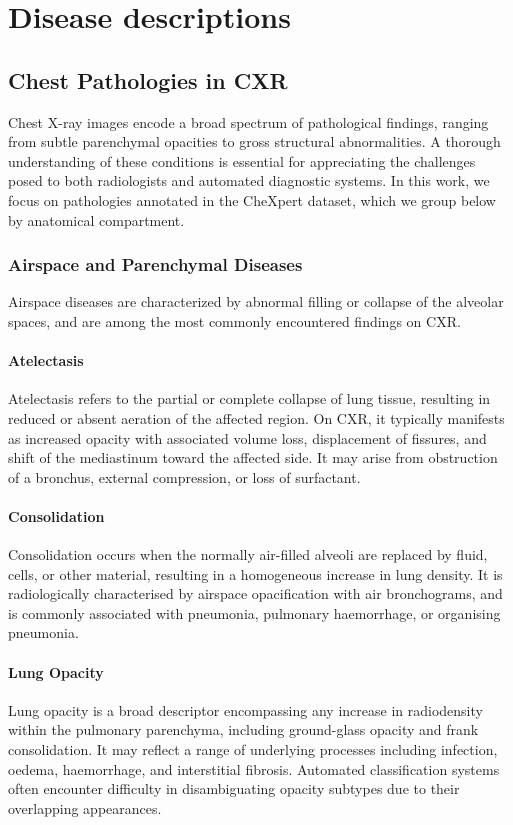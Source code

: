 \chapter{Disease descriptions}
\label{sec:pathologies}

\section{Chest Pathologies in CXR}

Chest X-ray images encode a broad spectrum of pathological findings, ranging from subtle parenchymal opacities 
to gross structural abnormalities. A thorough understanding of these conditions is essential for appreciating 
the challenges posed to both radiologists and automated diagnostic systems. In this work, we focus on 
pathologies annotated in the CheXpert dataset, which we group below by anatomical compartment.

\subsection{Airspace and Parenchymal Diseases}

Airspace diseases are characterized by abnormal filling or collapse of the alveolar spaces, and are among 
the most commonly encountered findings on CXR.

\subsubsection{Atelectasis}
Atelectasis refers to the partial or complete collapse of lung tissue, resulting in reduced or absent aeration 
of the affected region. On CXR, it typically manifests as increased opacity with associated volume loss, 
displacement of fissures, and shift of the mediastinum toward the affected side. It may arise from 
obstruction of a bronchus, external compression, or loss of surfactant.

\subsubsection{Consolidation}
Consolidation occurs when the normally air-filled alveoli are replaced by fluid, cells, or other material, 
resulting in a homogeneous increase in lung density. It is radiologically characterised by airspace opacification 
with air bronchograms, and is commonly associated with pneumonia, pulmonary haemorrhage, or organising 
pneumonia.

\subsubsection{Lung Opacity}
Lung opacity is a broad descriptor encompassing any increase in radiodensity within the pulmonary parenchyma, 
including ground-glass opacity and frank consolidation. It may reflect a range of underlying processes 
including infection, oedema, haemorrhage, and interstitial fibrosis. Automated classification systems often 
encounter difficulty in disambiguating opacity subtypes due to their overlapping appearances.


